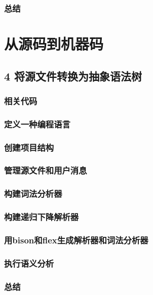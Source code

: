 \documentclass[11pt,a4paper,UTF8]{ctexart}
\begin{document}
		\subsubsection{总结}
	\section{从源码到机器码}
	\subsection{4 将源文件转换为抽象语法树}
		\subsubsection{相关代码}
		\subsubsection{定义一种编程语言}
		\subsubsection{创建项目结构}
		\subsubsection{管理源文件和用户消息}
		\subsubsection{构建词法分析器}
		\subsubsection{构建递归下降解析器}
		\subsubsection{用bison和flex生成解析器和词法分析器}
		\subsubsection{执行语义分析}
		\subsubsection{总结}
\end{document}
